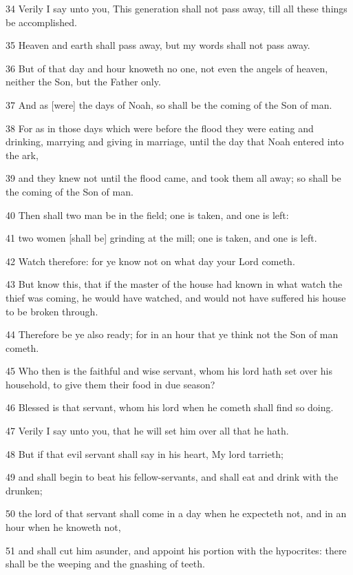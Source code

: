 \par 34 Verily I say unto you, This generation shall not pass away, till all these things be accomplished.
\par 35 Heaven and earth shall pass away, but my words shall not pass away.
\par 36 But of that day and hour knoweth no one, not even the angels of heaven, neither the Son, but the Father only.
\par 37 And as [were] the days of Noah, so shall be the coming of the Son of man.
\par 38 For as in those days which were before the flood they were eating and drinking, marrying and giving in marriage, until the day that Noah entered into the ark,
\par 39 and they knew not until the flood came, and took them all away; so shall be the coming of the Son of man.
\par 40 Then shall two man be in the field; one is taken, and one is left:
\par 41 two women [shall be] grinding at the mill; one is taken, and one is left.
\par 42 Watch therefore: for ye know not on what day your Lord cometh.
\par 43 But know this, that if the master of the house had known in what watch the thief was coming, he would have watched, and would not have suffered his house to be broken through.
\par 44 Therefore be ye also ready; for in an hour that ye think not the Son of man cometh.
\par 45 Who then is the faithful and wise servant, whom his lord hath set over his household, to give them their food in due season?
\par 46 Blessed is that servant, whom his lord when he cometh shall find so doing.
\par 47 Verily I say unto you, that he will set him over all that he hath.
\par 48 But if that evil servant shall say in his heart, My lord tarrieth;
\par 49 and shall begin to beat his fellow-servants, and shall eat and drink with the drunken;
\par 50 the lord of that servant shall come in a day when he expecteth not, and in an hour when he knoweth not,
\par 51 and shall cut him asunder, and appoint his portion with the hypocrites: there shall be the weeping and the gnashing of teeth.

